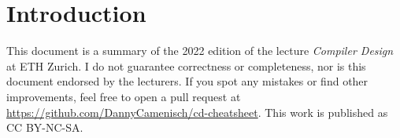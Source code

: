 \section{Introduction}

This document is a summary of the 2022 edition of the lecture \textit{Compiler Design} at ETH Zurich. I do not guarantee correctness or completeness, nor is this document endorsed by the lecturers. If you spot any mistakes or find other improvements, feel free to open a pull request at \url{https://github.com/DannyCamenisch/cd-cheatsheet}. This work is published as CC BY-NC-SA.
\begin{center}
	\ccbyncsa
\end{center}
